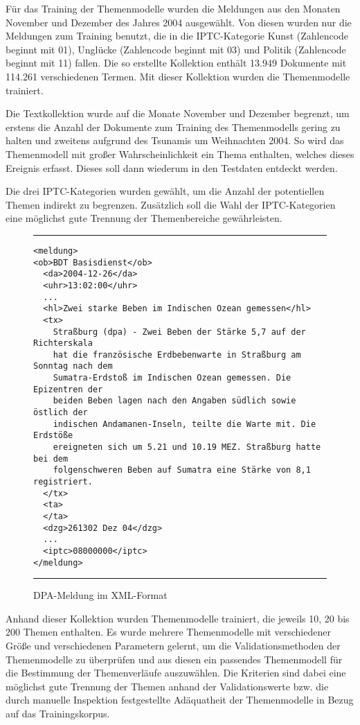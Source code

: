 Für das Training der Themenmodelle wurden die Meldungen aus den Monaten November und Dezember des Jahres 2004 ausgewählt. Von diesen wurden nur die Meldungen zum Training benutzt, die in die IPTC-Kategorie Kunst (Zahlencode beginnt mit 01), Unglücke (Zahlencode beginnt mit 03) und Politik (Zahlencode beginnt mit 11) fallen. Die so erstellte Kollektion enthält 13.949 Dokumente mit 114.261 verschiedenen Termen. Mit dieser Kollektion wurden die Themenmodelle trainiert.

Die Textkollektion wurde auf die Monate November und Dezember begrenzt, um erstens die Anzahl der Dokumente zum Training des Themenmodells gering zu halten und zweitens aufgrund des Tsunamis um Weihnachten 2004. So wird das Themenmodell mit großer Wahrscheinlichkeit ein Thema enthalten, welches dieses Ereignis erfasst. Dieses soll dann wiederum in den Testdaten entdeckt werden. 

Die drei IPTC-Kategorien wurden gewählt, um die Anzahl der potentiellen Themen indirekt zu begrenzen. Zusätzlich soll die Wahl der IPTC-Kategorien eine möglichst gute Trennung der Themenbereiche gewährleisten.

\begin{figure}[ht]
\rule{\textwidth}{1px} 
\footnotesize
\begin{verbatim}
<meldung>
<ob>BDT Basisdienst</ob>
  <da>2004-12-26</da>
  <uhr>13:02:00</uhr>
  ...
  <hl>Zwei starke Beben im Indischen Ozean gemessen</hl>
  <tx>
    Straßburg (dpa) - Zwei Beben der Stärke 5,7 auf der Richterskala
    hat die französische Erdbebenwarte in Straßburg am Sonntag nach dem
    Sumatra-Erdstoß im Indischen Ozean gemessen. Die Epizentren der
    beiden Beben lagen nach den Angaben südlich sowie östlich der
    indischen Andamanen-Inseln, teilte die Warte mit. Die Erdstöße
    ereigneten sich um 5.21 und 10.19 MEZ. Straßburg hatte bei dem
    folgenschweren Beben auf Sumatra eine Stärke von 8,1 registriert.
  </tx>
  <ta>
  </ta>
  <dzg>261302 Dez 04</dzg>
  ...
  <iptc>08000000</iptc>
</meldung>
\end{verbatim}
\rule{\textwidth}{1px} 
\caption{DPA-Meldung im XML-Format}
\label{fig:dpaXML}
\end{figure}

Anhand dieser Kollektion wurden Themenmodelle trainiert, die jeweils 10, 20 bis 200 Themen enthalten. Es wurde mehrere Themenmodelle mit verschiedener Größe und verschiedenen Parametern gelernt, um die Validationsmethoden der Themenmodelle zu überprüfen und aus diesen ein passendes Themenmodell für die Bestimmung der Themenverläufe auszuwählen. Die Kriterien sind dabei eine möglichst gute Trennung der Themen anhand der Validationswerte bzw. die durch manuelle Inspektion festgestellte Adäquatheit der Themenmodelle in Bezug auf das Trainingskorpus. 


